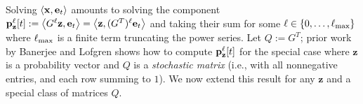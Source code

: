 Solving $\left< \mathbf{x}, \mathbf{e}_t \right>$ amounts to solving the component ${\mathbf{p}}_\mathbf{z}^{\ell}[t] := \left< G^{\ell}\mathbf{z}, \mathbf{e}_t \right> = \left< \mathbf{z}, (G^T)^{\ell}\mathbf{e}_t \right>$ and taking their sum for some $\ell \in \{0,\ldots,\ell_{\max}\}$ where $\ell_{\max}$ is a finite term truncating the power series. 
Let $Q:=G^T$; prior work by Banerjee and Lofgren \cite{banerjee2015fast} shows how to compute ${\mathbf{p}}_\mathbf{z}^{\ell}[t]$ for the special case where $\mathbf{z}$ is a probability vector and $Q$ is a \emph{stochastic matrix} (i.e., with all nonnegative entries, and each row summing to $1$). 
We now extend this result for any $\mathbf{z}$ and a special class of matrices $Q$.
